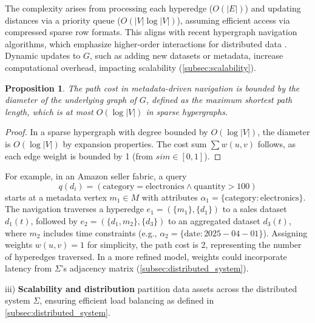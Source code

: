 \documentclass{amsart}
\newtheorem{prop}{Proposition}
\begin{document}
The complexity arises from processing each hyperedge (\( O(|E|) \)) and updating distances via a priority queue (\( O(|V| \log |V|) \)), assuming efficient access via compressed sparse row formats. This aligns with recent hypergraph navigation algorithms, which emphasize higher-order interactions for distributed data \cite{tang2025hypergraph}. Dynamic updates to \( G \), such as adding new datasets or metadata, increase computational overhead, impacting scalability (\cref{subsec:scalability}).

\begin{prop} \label{prop:navigation_cost_bound}
The path cost in metadata-driven navigation is bounded by the diameter of the underlying graph of \( G \), defined as the maximum shortest path length, which is at most \( O(\log |V|) \) in sparse hypergraphs.
\end{prop}

\begin{proof}
In a sparse hypergraph with degree bounded by \( O(\log |V|) \), the diameter is \( O(\log |V|) \) by expansion properties. The cost sum \( \sum w(u,v) \) follows, as each edge weight is bounded by 1 (from $sim \in  [0,1]$).
\end{proof}

For example, in an Amazon seller fabric, a query 
\[
 q(d_i) = (\text{category} = \text{electronics} \wedge \text{quantity} > 100) 
 \]
  starts at a metadata vertex \( m_1 \in M \) with attributes \( \alpha_1 = \{\text{category}: \text{electronics}\} \). The navigation traverses a hyperedge \( e_1 = (\{m_1\}, \{d_1\}) \) to a sales dataset \( d_1(t) \), followed by \( e_2 = (\{d_1, m_2\}, \{d_3\}) \) to an aggregated dataset \( d_3(t) \), where \( m_2 \) includes time constraints (e.g., \( \alpha_2 = \{\text{date}: 2025-04-01\} \)). Assigning weights \( w(u,v) = 1 \) for simplicity, the path cost is 2, representing the number of hyperedges traversed. In a more refined model, weights could incorporate latency from \( \Sigma \)'s adjacency matrix (\cref{subsec:distributed_system}).


iii) \textbf{Scalability and distribution} partition data assets across the distributed system \( \Sigma \), ensuring efficient load balancing as defined in \cref{subsec:distributed_system}.
\end{document}
